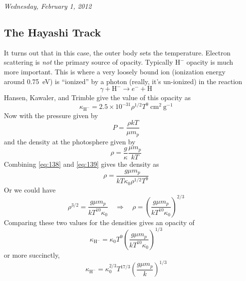 \documentclass[10pt]{article}
\numberwithin{equation}{section}
\newcommand{\n}{\noindent}
\begin{document}
  \n\textit{Wednesday, February 1, 2012}
  \subsection{The Hayashi Track}
  \label{sec:fully-conv-stars}
  \n It turns out that in this case, the outer body sets the
  temperature. Electron scattering is \emph{not} the primary source of
  opacity. Typically $\mathrm{H^-}$ opacity is much more
  important. This is where a very loosely bound ion (ionization energy
  around 0.75\ eV) is ``ionized'' by a photon (really, it's un-ionized)
  in the reaction
  \begin{equation}
    \label{eq:136}
    \gamma+\mathrm{H^-}\to e^{-}+\mathrm{H}
  \end{equation}
  Hansen, Kawaler, and Trimble give the value of this opacity as
  \begin{equation}
    \label{eq:137}
    \kappa_{\mathrm{H^-}}=2.5\times 10^{-31}\rho^{1/2} T^9\
    \mathrm{cm^2\ g^{-1}}
  \end{equation}
  Now with the pressure given by
  \begin{equation}
    \label{eq:138}
    P=\frac{\rho kT}{\mu m_p}
  \end{equation}
  and the density at the photosphere given by
  \begin{equation}
    \label{eq:139}
    \rho=\frac{g}{\kappa}\frac{\mu m_p}{kT}
  \end{equation}
  Combining \eqref{eq:138} and \eqref{eq:139} gives the density as
  \begin{equation}
    \label{eq:140}
    \rho=\frac{g\mu m_p}{kT \kappa_0 \rho^{1/2}T^9}
  \end{equation}
  Or we could have 
  \begin{equation}
    \label{eq:141}
    \rho^{3/2}=\frac{g\mu m_p}{kT^{10}\kappa_0}\quad\Rightarrow\quad
    \rho=\left(\frac{g\mu m_p}{kT^{10}\kappa_0}\right)^{2/3}
  \end{equation}
  Comparing these two values for the densities gives an opacity of
  \begin{equation}
    \label{eq:142}
    \kappa_{\mathrm{H^-}}=\kappa_0 T^9\left(\frac{g\mu m_p}{k T^
{10}\kappa_0}\right)^{1/3}
  \end{equation}
  or more succinctly,
  \begin{equation}
    \label{eq:143}
    \boxed{
    \kappa_{\mathrm{H^-}}=\kappa_0^{2/3}T^{17/3}\left(\frac{g\mu m_p}{k}
\right)^{1/3}}
  \end{equation}
\end{document}
